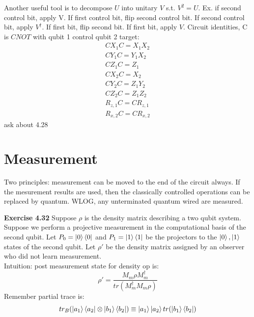 \documentclass{article}
\begin{document}
Another useful tool is to decompose $U$ into unitary $V$ s.t. $V^2 = U$. Ex. if second control bit, apply V. If first control bit, flip second control bit. If second control bit, apply $V^\dag$. If first bit, flip second bit. If first bit, apply $V$. 
Circuit identities, C is $CNOT$ with qubit 1 control qubit 2 target:
\begin{align}
	CX_1C = X_1 X_2\\
	CY_1C = Y_1 X_2\\
	C Z_1 C = Z_1 \\
	C X_2 C = X_2 \\
	C Y_2 C = Z_1 Y_2 \\
	C Z_2 C = Z_1 Z_2\\
	R_{z,1} C = C R_{z,1}\\
	R_{x,2}C = C R_{x,2} 
\end{align}
ask about 4.28

\section{Measurement}
Two principles: measurement can be moved to the end of the circuit always. If the mesurement results are used, then the classically controlled operations can be replaced by quantum. WLOG, any unterminated quantum wired are measured.
\begin{tcolorbox}\textbf{Exercise 4.32} Suppose $\rho$ is the density matrix describing a two qubit system. Suppose we perform a projective measurement in the computational basis of the second qubit. Let $P_0 = \ket{0} \bra{0}$ and $P_1 = \ket{1}\bra{1}$ be the projectors to the $\ket{0}, \ket1$ states of the second qubit. Let $\rho'$ be the density matrix assigned by an observer who did not learn measurement.\\
	Intuition: post measurement state for density op is:
	$$\rho' = \frac{M_m \rho M^\dag_m}{tr(M^\dag_m M_m \rho)}$$
	Remember partial trace is:
	$$tr_B(\ket{a_1}\bra{a_2} \otimes \ket{b_1} \bra{b_2}) \equiv \ket{a_1} \ket{a_2} tr(\ket{b_1}\bra{b_2})$$
\end{tcolorbox}
\end{document}
